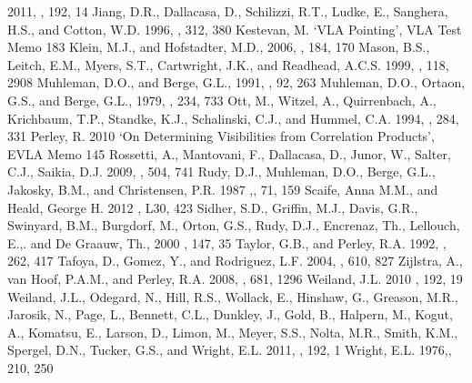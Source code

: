 \documentclass{aastex}
\begin{document}
\begin{thebibliography}{}
  2011, \apjs, 192, 14 
 Jiang, D.R., Dallacasa, D.,
  Schilizzi, R.T., Ludke, E., Sanghera, H.S., and Cotton, W.D. 1996,
  \aap, 312, 380
 Kestevan, M. `VLA Pointing', VLA Test
  Memo 183
 Klein, M.J., and
  Hofstadter, M.D., 2006, \icarus, 184, 170
 Mason, B.S., Leitch, E.M.,
  Myers, S.T., Cartwright, J.K., and Readhead, A.C.S. 1999, \apj, 118,
  2908
 Muhleman, D.O., and Berge,
  G.L., 1991, \icarus, 92, 263
 Muhleman, D.O., Ortaon,
  G.S., and Berge, G.L., 1979, \apj, 234, 733
 Ott, M., Witzel, A.,
  Quirrenbach, A., Krichbaum, T.P., Standke, K.J., Schalinski,  C.J.,
  and Hummel, C.A. 1994, \aap, 284, 331
 Perley, R. 2010 `On Determining
  Visibilities from Correlation Products', EVLA Memo 145
 Rossetti, A., Mantovani,
  F., Dallacasa, D., Junor, W., Salter, C.J., Saikia, D.J. 2009, \aap,
  504, 741
 Rudy, D.J., Muhleman, D.O., Berge,
  G.L., Jakosky, B.M., and Christensen, P.R. 1987 ,\icarus, 71, 159
 Scaife, Anna M.M., and Heald,
  George H. 2012 \mnras, L30, 423
 Sidher, S.D., Griffin, M.J.,
Davis, G.R., Swinyard, B.M., Burgdorf, M., Orton, G.S., Rudy, D.J.,
Encrenaz, Th., Lellouch, E.,. and De Graauw, Th., 2000 \icarus, 147, 35
 Taylor, G.B., and Perley,
R.A. 1992, \aap, 262, 417
 Tafoya, D., Gomez, Y., and
  Rodriguez, L.F. 2004, \apj, 610, 827
 Zijlstra, A.,
  van Hoof, P.A.M., and Perley, R.A. 2008, \apj, 681, 1296
 Weiland, J.L. 2010 \apjs, 192, 19
 Weiland, J.L., Odegard, N.,
  Hill, R.S., Wollack, E., Hinshaw, G., Greason, M.R., Jarosik, N.,
  Page, L., Bennett, C.L., Dunkley, J., Gold, B., Halpern, M., Kogut,
  A., Komatsu, E., Larson, D., Limon, M., Meyer, S.S., Nolta, M.R.,
  Smith, K.M., Spergel, D.N., Tucker, G.S., and Wright, E.L. 2011,
  \apjs, 192, 1
 Wright, E.L. 1976,\apj, 210, 250


\end{thebibliography}
 
\end{document}
